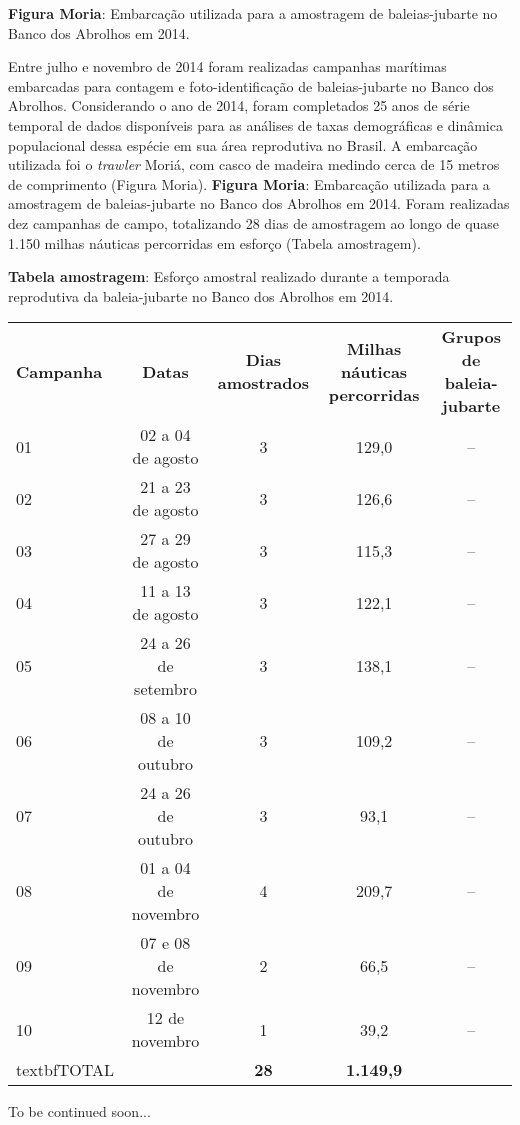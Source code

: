 \textbf{Figura Moria}: Embarcação utilizada para a amostragem de baleias-jubarte no Banco dos Abrolhos em 2014.

Entre julho e novembro de 2014 foram realizadas campanhas marítimas embarcadas para contagem e foto-identificação de baleias-jubarte no Banco dos Abrolhos. Considerando o ano de 2014, foram completados 25 anos de série temporal de dados disponíveis para as análises de taxas demográficas e dinâmica populacional dessa espécie em sua área reprodutiva no Brasil. A embarcação utilizada foi o \textit{trawler} Moriá, com casco de madeira medindo cerca de 15 metros de comprimento (Figura Moria).  \textbf{Figura Moria}: Embarcação utilizada para a amostragem de baleias-jubarte no Banco dos Abrolhos em 2014.   Foram realizadas dez campanhas de campo, totalizando 28 dias de amostragem ao longo de quase 1.150 milhas náuticas percorridas em esforço (Tabela amostragem).  

\textbf{Tabela amostragem}: Esforço amostral realizado durante a temporada reprodutiva da baleia-jubarte no Banco dos Abrolhos em 2014.  

\begin{tabular}{lcccc}  
\textbf{Campanha} & \textbf{Datas} & \textbf{Dias amostrados} & \textbf{Milhas náuticas percorridas} & \textbf{Grupos de baleia-jubarte} \\
01 & 02 a 04 de agosto & 3 & 129,0 & -- \\
02 & 21 a 23 de agosto & 3 & 126,6 & -- \\
03 & 27 a 29 de agosto & 3 & 115,3 & -- \\
04 & 11 a 13 de agosto & 3 & 122,1 & -- \\
05 & 24 a 26 de setembro & 3 & 138,1 & -- \\
06 & 08 a 10 de outubro & 3 & 109,2 & -- \\
07 & 24 a 26 de outubro & 3 & 93,1 & -- \\
08 & 01 a 04 de novembro & 4 & 209,7 & -- \\
09 & 07 e 08 de novembro & 2 & 66,5 & -- \\
10 & 12 de novembro & 1 & 39,2 & -- \\
textbf{TOTAL} & & \textbf{28} & \textbf{1.149,9} & \\
     
\end{tabular}    

To be continued soon... 